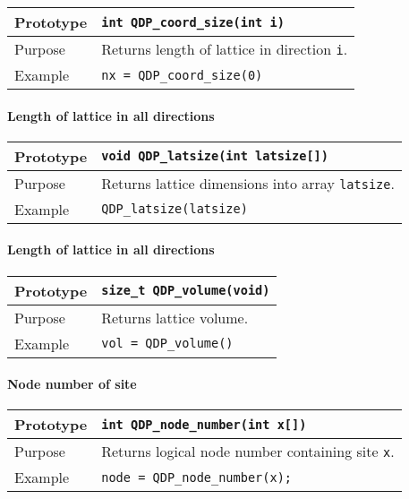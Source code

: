 \documentclass{article}
\begin{document}
\begin{flushleft}
  \begin{tabular}{|l|l|}
  \hline
  Prototype      & \verb|int QDP_coord_size(int i)|\\
    \hline
  Purpose        & Returns length of lattice in direction \verb|i|. \\
\hline
  Example  & \verb|nx = QDP_coord_size(0)|\\
   \hline
 \end{tabular}
\end{flushleft}

\paragraph{Length of lattice in all directions}

\begin{flushleft}
  \begin{tabular}{|l|l|}
  \hline
  Prototype      & \verb|void QDP_latsize(int latsize[])|\\
    \hline
  Purpose        & Returns lattice dimensions into array \verb|latsize|.\\
\hline
  Example  & \verb|QDP_latsize(latsize)|\\
   \hline
 \end{tabular}
\end{flushleft}

\paragraph{Length of lattice in all directions}

\begin{flushleft}
  \begin{tabular}{|l|l|}
  \hline
  Prototype      & \verb|size_t QDP_volume(void)|\\
    \hline
  Purpose        & Returns lattice volume.\\
\hline
  Example  & \verb|vol = QDP_volume()|\\
   \hline
 \end{tabular}
\end{flushleft}

\paragraph{Node number of site}

\begin{flushleft}
  \begin{tabular}{|l|l|}
  \hline
  Prototype      & \verb|int QDP_node_number(int x[])|\\
    \hline
  Purpose        & Returns logical node number containing site \verb|x|. \\
\hline
  Example  & \verb|node = QDP_node_number(x);| \\
   \hline
 \end{tabular}
\end{flushleft}
\end{document}

